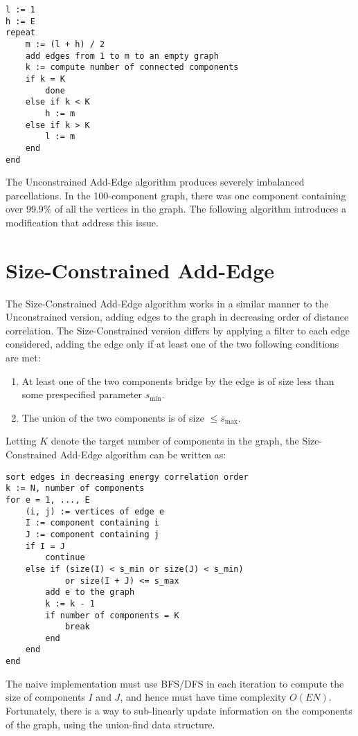 \begin{verbatim}
l := 1
h := E
repeat
    m := (l + h) / 2
    add edges from 1 to m to an empty graph
    k := compute number of connected components
    if k = K
        done
    else if k < K
        h := m
    else if k > K
        l := m
    end
end
\end{verbatim}

The Unconstrained Add-Edge algorithm produces severely imbalanced
parcellations. In the 100-component graph, there was one component
containing over 99.9\% of all the vertices in the graph. The following
algorithm introduces a modification that address this issue.

\section{Size-Constrained Add-Edge}

The Size-Constrained Add-Edge algorithm works in a similar manner to the
Unconstrained version, adding edges to the graph in decreasing order of
distance correlation. The Size-Constrained version differs by applying
a filter to each edge considered, adding the edge only if at least one
of the two following conditions are met:

\begin{enumerate}[1.]
\item
At least one of the two components bridge by the edge is of size less
than some prespecified parameter $s_{\min}$.

\item
The union of the two components is of size $\leq s_{\max}$.
\end{enumerate}

Letting $K$ denote the target number of components in the graph, the
Size-Constrained Add-Edge algorithm can be written as:

\begin{verbatim}
sort edges in decreasing energy correlation order
k := N, number of components
for e = 1, ..., E
    (i, j) := vertices of edge e
    I := component containing i
    J := component containing j
    if I = J
        continue
    else if (size(I) < s_min or size(J) < s_min)
            or size(I + J) <= s_max
        add e to the graph
        k := k - 1
        if number of components = K
            break
        end
    end
end
\end{verbatim}

The naive implementation must use BFS/DFS in each iteration to compute
the size of components $I$ and $J$, and hence must have time complexity
$O(EN)$. Fortunately, there is a way to sub-linearly update information
on the components of the graph, using the union-find data structure.

